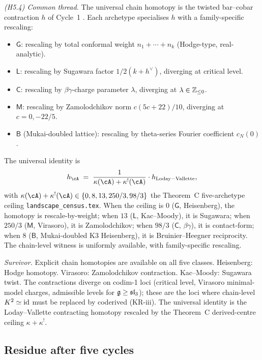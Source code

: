\emph{(H5.4) Common thread.} The universal chain homotopy is the
twisted bar--cobar contraction $h$ of Cycle~1
\cite[eq.\ (2.17)]{LV12}. Each archetype specialises $h$ with a
family-specific rescaling:
\begin{itemize}
\item $\mathsf{G}$: rescaling by total conformal weight
$n_{1}+\cdots+n_{k}$ (Hodge-type, real-analytic).
\item $\mathsf{L}$: rescaling by Sugawara factor
$1/2(k+h^{\vee})$, diverging at critical level.
\item $\mathsf{C}$: rescaling by $\beta\gamma$-charge parameter
$\lambda$, diverging at $\lambda\in\mathbb{Z}_{\leq 0}$.
\item $\mathsf{M}$: rescaling by Zamolodchikov norm
$c(5c+22)/10$, diverging at $c = 0, -22/5$.
\item $\mathsf{B}$ (Mukai-doubled lattice): rescaling by theta-series
Fourier coefficient $c_{N}(0)$.
\end{itemize}
The universal identity is
\[
h_{\cA} \;=\; \frac{1}{\kappa(\cA) + \kappa^{!}(\cA)} \cdot h_{\mathrm{Loday-Vallette}},
\]
with $\kappa(\cA) + \kappa^{!}(\cA)\in\{0, 8, 13, 250/3, 98/3\}$
the Theorem~C five-archetype ceiling
\texttt{landscape\_census.tex}. When the ceiling is $0$
($\mathsf{G}$, Heisenberg), the homotopy is rescale-by-weight; when
$13$ ($\mathsf{L}$, Kac--Moody), it is Sugawara; when $250/3$
($\mathsf{M}$, Virasoro), it is Zamolodchikov; when $98/3$
($\mathsf{C}$, $\beta\gamma$), it is contact-form; when $8$
($\mathsf{B}$, Mukai-doubled K3 Heisenberg), it is
Bruinier--Heegner reciprocity. The chain-level witness is
uniformly available, with family-specific rescaling.

\emph{Survivor.} Explicit chain homotopies are available on
all five classes. Heisenberg: Hodge homotopy. Virasoro:
Zamolodchikov contraction. Kac--Moody: Sugawara twist. The
contractions diverge on codim-1 loci (critical level, Virasoro
minimal-model charges, admissible levels for $\mathfrak{g}\geq\mathfrak{sl}_{3}$);
these are the loci where chain-level $K^{2}\simeq\mathrm{id}$ must be
replaced by coderived (KR-iii). The universal identity is the
Loday--Vallette contracting homotopy rescaled by the
Theorem~C derived-centre ceiling $\kappa + \kappa^{!}$.

\subsection*{Residue after five cycles}

